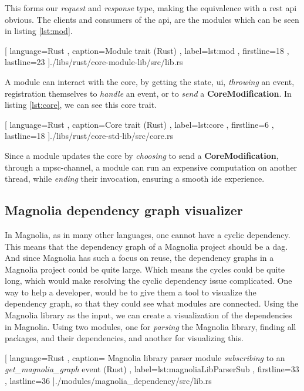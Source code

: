 This forms our \textit{request} and \textit{response} type, making the
equivalence with a \gls*{rest} \gls*{api} obvious. The clients and consumers
of the \gls*{api}, are the modules which can be seen in listing \ref{lst:mod}.

\begin{center}
  
    [ language=Rust
    , caption={Module trait (Rust)}
    , label=lst:mod
    , firstline=18
    , lastline=23
    ]{./libs/rust/core-module-lib/src/lib.rs}
\end{center}

A module can interact with the core, by getting the state, \gls*{ui},
\textit{throwing} an event, registration themselves to \textit{handle} an
event, or to \textit{send} a \textbf{CoreModification}. In listing
\ref{lst:core}, we can see this core trait.

\begin{code}[H]
  
    [ language=Rust
    , caption={Core trait (Rust)}
    , label=lst:core
    , firstline=6
    , lastline=18
    ]{./libs/rust/core-std-lib/src/core.rs}
\end{code}

Since a module updates the core by \textit{choosing} to send a
\textbf{CoreModification}, through a \gls*{mpsc}-channel, a module can run an
expensive computation on another thread, while \textit{ending} their
invocation, ensuring a smooth \gls*{ide} experience.


\subsection{Magnolia dependency graph visualizer}

In Magnolia, as in many other languages, one cannot have a cyclic dependency.
This means that the dependency graph of a Magnolia project should be a
\gls*{dag}. And since Magnolia has such a focus on reuse, the dependency graphs
in a Magnolia project could be quite large. Which means the cycles could be
quite long, which would make resolving the cyclic dependency issue complicated.
One way to help a developer, would be to give them a tool to visualize the
dependency graph, so that they could see what modules are connected. Using the
Magnolia library as the input, we can create a visualization of the dependencies
in Magnolia. Using two modules, one for \textit{parsing} the Magnolia library,
finding all packages, and their dependencies, and another for visualizing
this.

\begin{code}[H]
  
    [ language=Rust
    , caption={
      Magnolia library parser module \textit{subscribing} to an
      \textit{get\_magnolia\_graph } event (Rust)
    }
    , label=lst:magnoliaLibParserSub
    , firstline=33
    , lastline=36
    ]{./modules/magnolia\_dependency/src/lib.rs}
\end{code}

